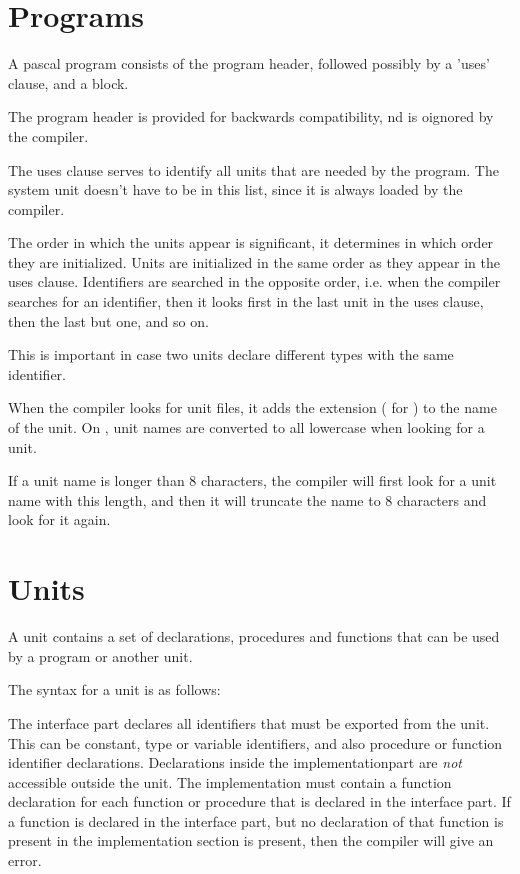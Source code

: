 \documentclass{report}
\begin{document}
\section{Programs}
A pascal program consists of the program header, followed possibly by a 
'uses' clause, and a block.



The program header is provided for backwards compatibility, nd is oignored
by the compiler.

The uses clause serves to identify all units that are needed by the program.
The system unit doesn't have to be in this list, since it is always loaded
by the compiler.

The order in which the units appear is significant, it determines in
which order they are initialized. Units are initialized in the same order
as they appear in the uses clause. Identifiers are searched in the opposite
order, i.e. when the compiler searches for an identifier, then it looks
first in the last unit in the uses clause, then the last but one, and so on.

This is important in case two units declare different types with the same 
identifier.

When the compiler looks for unit files, it adds the extension 
( for \windowsnt) to the name of the unit. On \linux, unit names
are converted to all lowercase when looking for a unit.

If a unit name is longer than 8 characters, the compiler will first look for
a unit name with this length, and then it will truncate the name to 8
characters and look for it again.

\section{Units}

A unit contains a set of declarations, procedures and functions that can be
used by a program or another unit.

The syntax for a unit is as follows:



The interface part declares all identifiers that must be exported from the
unit. This can be constant, type or variable identifiers, and also procedure
or function identifier declarations. Declarations inside the
implementationpart are {\em not} accessible outside the unit. The
implementation must contain a function declaration for each function or
procedure that is declared in the interface part. If a function is declared
in the interface part, but no declaration of that function is present in the 
implementation section is present, then the compiler will give an error.
\end{document}

